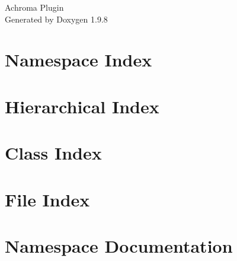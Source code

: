 \documentclass[twoside]{book}
\newcommand{\+}{\discretionary{\mbox{\scriptsize$\hookleftarrow$}}{}{}}
\newcommand{\clearemptydoublepage}{%
    \newpage{\pagestyle{empty}\cleardoublepage}%
  }
\begin{document}
  \raggedbottom
    \hypersetup{pageanchor=false,
                bookmarksnumbered=true,
                pdfencoding=unicode
               }
  \begin{titlepage}
  \vspace*{7cm}
  \begin{center}%
  {\Large Achroma Plugin}\\
  \vspace*{1cm}
  {\large Generated by Doxygen 1.9.8}\\
  \end{center}
  \end{titlepage}
  \clearemptydoublepage
  \tableofcontents
  \clearemptydoublepage
  \hypersetup{pageanchor=true}

\chapter{Namespace Index}

\chapter{Hierarchical Index}

\chapter{Class Index}

\chapter{File Index}

\chapter{Namespace Documentation}


\end{document}
